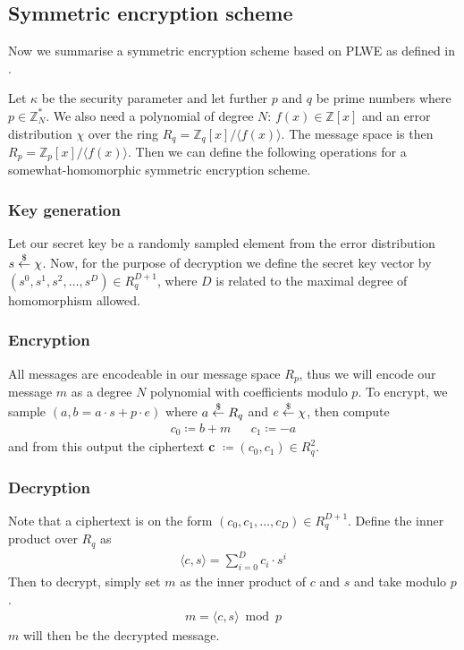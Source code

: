 \documentclass[../main.tex]{subfiles}
\begin{document}
\subsection{Symmetric encryption scheme}

Now we summarise a symmetric encryption scheme based on PLWE as defined in \cite{brakerski2011fully}.

Let $\kappa$ be the security parameter and let further $p$ and $q$ be prime numbers where $p \in \mathbb{Z}_N^*$.
We also need a polynomial of degree $N$: $f(x) \in \mathbb{Z}[x]$ and an error distribution $\chi$ over the ring
$R_q = \mathbb{Z}_q[x] / \langle f(x) \rangle$. The message space is then $R_p = \mathbb{Z}_p[x] / \langle f(x) \rangle$.
Then we can define the following operations for a somewhat-homomorphic symmetric encryption scheme.

\subsubsection{Key generation}
Let our secret key be a randomly sampled element from the error distribution $s \overset{\$}{\gets}{} \chi$.
Now, for the purpose of decryption we define the secret key vector by $(s^0, s^1, s^2, \dots, s^D) \in R_q^{D+1}$, where $D$ is related to the maximal degree of homomorphism allowed.

\subsubsection{Encryption}
All messages are encodeable in our message space $R_p$, thus we will encode our message $m$ as a degree $N$
polynomial with coefficients modulo $p$.
To encrypt, we sample $(a, b = a \cdot s + p \cdot e)$ where $a \overset{\$}{\gets}{} R_q$ and $e \overset{\$}{\gets}{} \chi$,
then compute
\begin{align*}
    c_0 \coloneqq b + m &  & c_1 \coloneqq -a
\end{align*}
and from this output the ciphertext \textbf{c} $\coloneqq (c_0, c_1) \in R_q^2$.

\subsubsection{Decryption}
Note that a ciphertext is on the form $(c_0, c_1, \dots , c_D) \in R_q^{D+1}$.
Define the inner product over $R_q$ as
\begin{align*}
    \langle c, s \rangle = \sum_{i=0}^D c_i \cdot s^i
\end{align*}
Then to decrypt, simply set $m$ as the inner product of $c$ and $s$ and take modulo $p$.
\begin{align*}
    m = \langle c, s \rangle \bmod p
\end{align*}
$m$ will then be the decrypted message.
\end{document}
